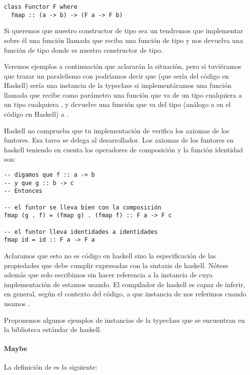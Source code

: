 \begin{verbatim}
class Functor F where
  fmap :: (a -> b) -> (F a -> F b)
\end{verbatim}

Si queremos que nuestro constructor de tipo
sea un  tendremos
que implementar sobre él una función llamada  que reciba
una función de tipo  y nos devuelva una función
de tipo  donde  es nuestro constructor de tipo.

Veremos ejemplos a continuación que aclararán la situación, pero si
tuviéramos que trazar un paralelismo con  podríamos decir
que  (que sería  del código en Haskell) sería una
instancia de la typeclass  si implementáramos una función
llamada  que recibe como parámetro una función que va
de un tipo cualquiera  a un tipo cualquiera , y
devuelve una función que va del tipo  (análogo a
 en el código en Haskell) a .

Haskell no comprueba que tu implementación de 
verifica los axiomas de los funtores. Esa tarea se delega al
desarrollador. Los axiomas de los funtores en
haskell teniendo en cuenta los
operadores de composición  y la función identidad son:

\begin{verbatim}
-- digamos que f :: a -> b
-- y que g :: b -> c
-- Entonces

-- el funtor se lleva bien con la composición
fmap (g . f) = (fmap g) . (fmap f) :: F a -> F c

-- el funtor lleva identidades a identidades
fmap id = id :: F a -> F a
\end{verbatim}

Aclaramos que esto no es código en haskell sino la especificación
de las propiedades que debe cumplir  expresadas con la
sintaxis de haskell.
Nótese además que solo escribimos  sin hacer referencia a
la instancia de  cuya implementación de 
estamos usando. El compilador de haskell es capaz de inferir,
en general, según el contexto del código, a que instancia de
 nos referimos cuando usamos .

Proponemos algunos ejemplos de instancias de la typeclass
que se encuentran en la biblioteca estándar
de haskell.

\paragraph{Maybe}
La definición de  es la siguiente:

